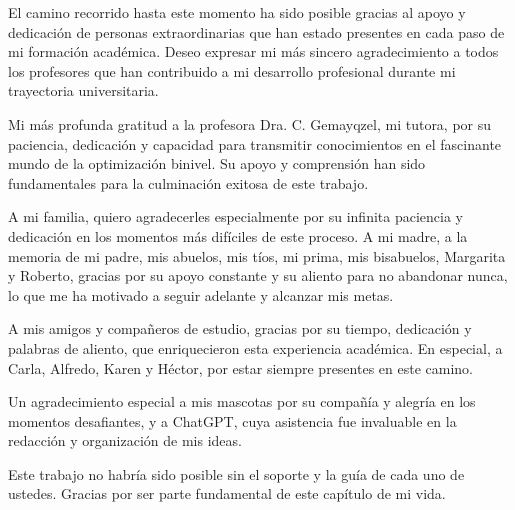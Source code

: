 \begin{acknowledgements}

    \noindent
    El camino recorrido hasta este momento ha sido posible gracias al apoyo y dedicación de personas extraordinarias que han estado presentes en cada paso de mi formación académica. Deseo expresar mi más sincero agradecimiento a todos los profesores que han contribuido a mi desarrollo profesional durante mi trayectoria universitaria.
    
    \vspace{1em}
    
    \noindent
    Mi más profunda gratitud a la profesora Dra. C. Gemayqzel, mi tutora, por su paciencia, dedicación y capacidad para transmitir conocimientos en el fascinante mundo de la optimización binivel. Su apoyo y comprensión han sido fundamentales para la culminación exitosa de este trabajo.
    
    \vspace{1em}
    
    \noindent
    A mi familia, quiero agradecerles especialmente por su infinita paciencia y dedicación en los momentos más difíciles de este proceso. A mi madre, a la memoria de mi padre, mis abuelos, mis tíos, mi prima, mis bisabuelos, Margarita y Roberto, gracias por su apoyo constante y su aliento para no abandonar nunca, lo que me ha motivado a seguir adelante y alcanzar mis metas.
    
    \vspace{1em}
    
    \noindent
    A mis amigos y compañeros de estudio, gracias por su tiempo, dedicación y palabras de aliento, que enriquecieron esta experiencia académica. En especial, a Carla, Alfredo, Karen y Héctor, por estar siempre presentes en este camino.
    
    \vspace{1em}
    
    \noindent
    Un agradecimiento especial a mis mascotas por su compañía y alegría en los momentos desafiantes, y a ChatGPT, cuya asistencia fue invaluable en la redacción y organización de mis ideas.
    
    \vspace{1em}
    
    \noindent
    Este trabajo no habría sido posible sin el soporte y la guía de cada uno de ustedes. Gracias por ser parte fundamental de este capítulo de mi vida.
    
    \end{acknowledgements}